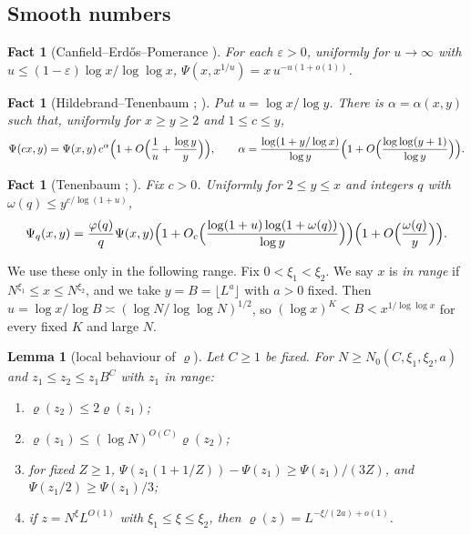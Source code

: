 \documentclass[11pt]{amsart}
\newtheorem{lemma}[theorem]{Lemma}
\newtheorem{fact}[theorem]{Fact}
\theoremstyle{definition}
\begin{document}
\subsection{Smooth numbers}

\begin{fact}[Canfield--Erd\H{o}s--Pomerance \cite{cep1983}]\label{fact:CEP}
For each $\varepsilon>0$, uniformly for $u\to\infty$ with $u\le(1-\varepsilon)\log x/\log\log x$,
$\Psi(x,x^{1/u})=x\,u^{-u(1+o(1))}$.
\end{fact}

\begin{fact}[Hildebrand--Tenenbaum {\cite[Thms.~2(i), 3]{ht1986}}; {\cite[Fact~3.15]{lv2018}}]\label{fact:HT}
Put $u=\log x/\log y$. There is $\alpha=\alpha(x,y)$ such that, uniformly for $x\ge y\ge2$ and $1\le c\le y$,
\[
\Psi(cx,y)=\Psi(x,y)\,c^{\alpha}\Bigl(1+O\Bigl(\frac1u+\frac{\log y}{y}\Bigr)\Bigr),\qquad
\alpha=\frac{\log(1+y/\log x)}{\log y}\Bigl(1+O\Bigl(\frac{\log\log(y+1)}{\log y}\Bigr)\Bigr).
\]
\end{fact}

\begin{fact}[Tenenbaum \cite{tenenbaum1993}; {\cite[Fact~3.16, Cor.~3.17]{lv2018}}]\label{fact:Ten}
Fix $c>0$. Uniformly for $2\le y\le x$ and integers $q$ with $\omega(q)\le y^{c/\log(1+u)}$,
\[
\Psi_q(x,y)=\frac{\varphi(q)}{q}\Psi(x,y)\Bigl(1+O_c\Bigl(\frac{\log(1+u)\log(1+\omega(q))}{\log y}\Bigr)\Bigr)
\Bigl(1+O\Bigl(\frac{\omega(q)}{y}\Bigr)\Bigr).
\]
\end{fact}

We use these only in the following range. Fix $0<\xi_1<\xi_2$. We say $x$ is \emph{in range} if
$N^{\xi_1}\le x\le N^{\xi_2}$, and we take $y=B=\lfloor L^{a}\rfloor$ with $a>0$ fixed. Then
$u=\log x/\log B\asymp(\log N/\log\log N)^{1/2}$, so $(\log x)^K<B<x^{1/\log\log x}$ for every fixed $K$ and large $N$.

\begin{lemma}[local behaviour of $\varrho$]\label{lem:local}
Let $C\ge1$ be fixed. For $N\ge N_0(C,\xi_1,\xi_2,a)$ and $z_1\le z_2\le z_1B^{C}$ with $z_1$ in range:
\begin{enumerate}[label=(\roman*)]
\item $\varrho(z_2)\le2\varrho(z_1)$;
\item $\varrho(z_1)\le(\log N)^{O(C)}\varrho(z_2)$;
\item for fixed $Z\ge1$, $\Psi(z_1(1+1/Z))-\Psi(z_1)\ge\Psi(z_1)/(3Z)$, and $\Psi(z_1/2)\ge\Psi(z_1)/3$;
\item if $z=N^{\xi}L^{O(1)}$ with $\xi_1\le\xi\le\xi_2$, then $\varrho(z)=L^{-\xi/(2a)+o(1)}$.
\end{enumerate}
\end{lemma}
\end{document}
